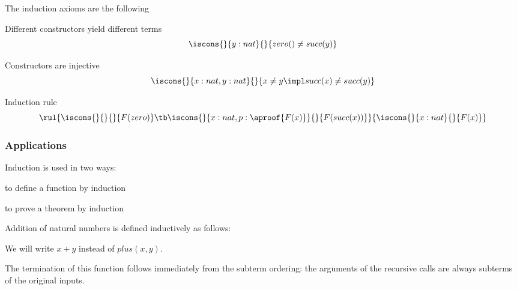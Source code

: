 \begin{example}
The induction axioms are the following
\begin{compactitem}
\item Different constructors yield different terms
 \[\iscons{}{y:nat}{}{zero()\neq succ(y)}\]
\item Constructors are injective
 \[\iscons{}{x:nat,y:nat}{}{x\neq y\impl succ(x)\neq succ(y)}\]
\item Induction rule
\[
\rul{\iscons{}{}{}{F(zero)}\tb\iscons{}{x:nat, p: \aproof{F(x)}}{}{F(succ(x))}}
    {\iscons{}{x:nat}{}{F(x)}}
\]
\end{compactitem}
\end{example}

\subsubsection{Applications}

Induction is used in two ways:
\begin{compactitem}
 \item to define a function by induction
 \item to prove a theorem by induction
\end{compactitem}

\begin{example}
Addition of natural numbers is defined inductively as follows:

\begin{acode}
\end{acode}
We will write $x+y$ instead of $plus(x,y)$.

The termination of this function follows immediately from the subterm ordering: the arguments of the recursive calls are always subterms of the original inputs.
\end{example}

